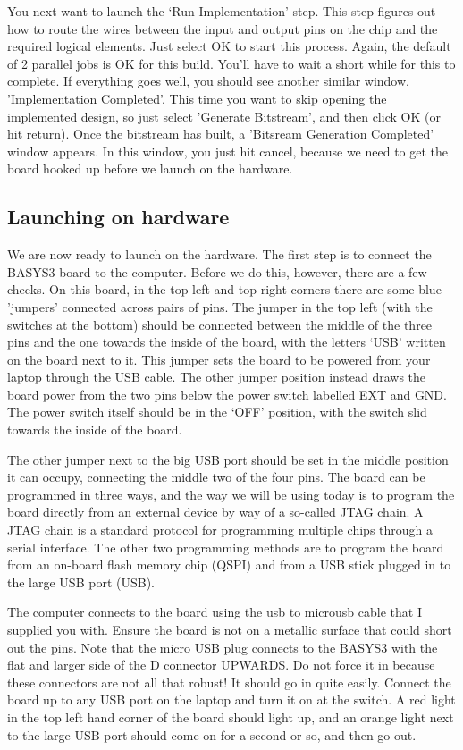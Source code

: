 \documentclass[../physical_computing.tex]{subfiles}
\begin{document}
You next want to launch the `Run Implementation' step. This step figures out how to route the wires between the input and output pins on the chip and the required logical elements. Just select OK to start this process. Again, the default of 2 parallel jobs is OK for this build. You'll have to wait a short while for this to complete. If everything goes well, you should see another similar window, 'Implementation Completed'. This time you want to skip opening the implemented design, so just select 'Generate Bitstream', and then click OK (or hit return). Once the bitstream has built, a 'Bitsream Generation Completed' window appears. In this window, you just hit cancel, because we need to get the board hooked up before we launch on the hardware.

\subsection{Launching on hardware}
\label{sec:launchingonhardware}

We are now ready to launch on the hardware. The first step is to connect the BASYS3 board to the computer. Before we do this, however, there are a few checks. On this board, in the top left and top right corners there are some blue 'jumpers' connected across pairs of pins. The jumper in the top left (with the switches at the bottom) should be connected between the middle of the three pins and the one towards the inside of the board, with the letters `USB' written on the board next to it. This jumper sets the board to be powered from your laptop through the USB cable. The other jumper position instead draws the board power from the two pins below the power switch labelled EXT and GND. The power switch itself should be in the `OFF' position, with the switch slid towards the inside of the board. 

The other jumper next to the big USB port should be set in the middle position it can occupy, connecting the middle two of the four pins. The board can be programmed in three ways, and the way we will be using today is to program the board directly from an external device by way of a so-called JTAG chain. A JTAG chain is a standard protocol for programming multiple chips through a serial interface. The other two programming methods are to program the board from an on-board flash memory chip (QSPI) and from a USB stick plugged in to the large USB port (USB). 

The computer connects to the board using the usb to microusb cable that I supplied you with. Ensure the board is not on a metallic surface that could short out the pins. Note that the micro USB plug connects to the BASYS3 with the flat and larger side of the D connector UPWARDS. Do not force it in because these connectors are not all that robust! It should go in quite easily. Connect the board up to any USB port on the laptop and turn it on at the switch. A red light in the top left hand corner of the board should light up, and an orange light next to the large USB port should come on for a second or so, and then go out.
\end{document}
